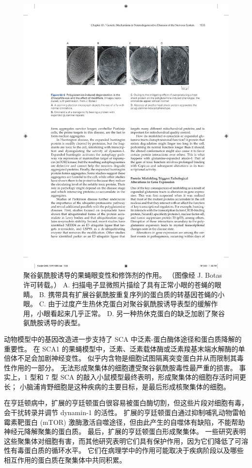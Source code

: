 \begin{figure}[htbp]
	\centering
	\includegraphics[width=0.7\linewidth]{chap63/fig_63_5}
	\caption{聚谷氨酰胺诱导的果蝇眼变性和修饰剂的作用。 （图像经 J. Botas 许可转载。） A. 扫描电子显微照片描绘了具有正常小眼的苍蝇的眼睛。 B. 携带具有扩展谷氨酰胺重复序列的蛋白质的转基因苍蝇的小眼。 C. 由于过度产生热休克蛋白对聚谷氨酰胺诱导表型的缓解作用，小眼看起来几乎正常。 D. 另一种热休克蛋白的缺乏加剧了聚谷氨酰胺诱导的表型。}
	\label{fig:63_5}
\end{figure}


动物模型中的基因改造进一步支持了 SCA 中泛素-蛋白酶体途径和蛋白质降解的重要性。
在 SCA1 的果蝇模型中，泛素、泛素载体酶或泛素羧基末端水解酶的单倍体不足会加剧神经变性。
似乎内含物是细胞试图隔离突变蛋白并从而限制其毒性作用的一部分。
无法形成聚集体的细胞遭受聚谷氨酰胺毒性最严重的损害。
事实上，1 型和 7 型 SCA 的敲入小鼠模型最终表明，形成聚集体的细胞存活时间更长；
小脑浦肯野细胞是这种疾病的主要目标，是最后形成核聚集体的细胞。


在亨廷顿病中，扩展的亨廷顿蛋白很容易被蛋白酶切割，但这些片段对细胞有毒，会干扰转录并调节 dynamin-1 的活性。
扩展的亨廷顿蛋白通过抑制哺乳动物雷帕霉素靶蛋白 (mTOR) 激酶激活自噬途径，但由此产生的自噬体有缺陷，不能帮助神经元降解聚集的蛋白质。
最后，扩展的亨廷顿蛋白形成聚集体。
一些研究表明这些聚集体对细胞有害，而其他研究表明它们具有保护作用，因为它们降低了可溶性有毒蛋白质的循环水平。
它们在病理学中的作用可能取决于疾病阶段以及哪些相互作用的蛋白质在聚集体中共同积累。


